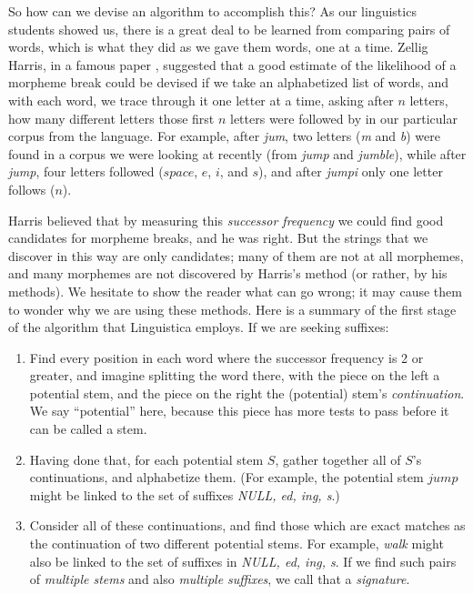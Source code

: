\documentclass[output=paper,colorlinks,citecolor=brown,
]{langscibook}
\begin{document}
So how can we devise an algorithm to accomplish this? As our linguistics students showed us, there is a great deal to be learned from comparing pairs of words, which is what they did as we gave them words, one at a time. Zellig Harris, in a famous paper \cite{Harris1955}, suggested that a good estimate of the likelihood of a morpheme break could be devised if we take an alphabetized list of words, and with each word, we trace through it one letter at a time, asking after $n$ letters, how many different letters  those first $n$ letters were followed by in our particular corpus from the language. For example, after \textit{jum}, two letters (\textit{m} and \textit{b}) were found in a corpus we were looking at recently (from \textit{jump} and \textit{jumble}), while after \textit{jump}, four letters followed ($space$, $e$, $i$, and $s$), and after \textit{jumpi} only one letter follows ($n$).

Harris believed that by measuring this \textit{successor frequency} we could find good candidates for morpheme breaks, and he was right. But the strings that we discover in this way are only candidates; many of them are not at all morphemes, and many morphemes are not discovered by Harris's method (or rather, by his methods). We hesitate to show the reader what can go wrong; it may cause them to wonder why we are using these methods. Here is a summary of the first stage of the algorithm that Linguistica employs. If we are seeking suffixes:
\begin{enumerate}
\item  Find every position in each word where the successor frequency is 2 or greater, and imagine splitting the word there, with the piece on the left a potential stem, and the piece on the right the (potential) stem's \textit{continuation}. We say ``potential'' here, because this piece has more tests to pass before it can be called a stem.

\item  Having done that, for each potential stem $S$, gather together all of $S$'s continuations, and alphabetize them. (For example, the potential stem $jump$ might be linked to the set of suffixes \textit{NULL, ed, ing, s}.) 

\item   Consider all of these continuations, and find those which are exact matches as the continuation of two different potential stems. For example, \textit{walk} might also be linked to the set of suffixes in \textit{NULL, ed, ing, s}. If we find such pairs of \textit{multiple stems} and also \textit{multiple suffixes}, we call that a \textit{signature}.
\end{enumerate}
\end{document}
